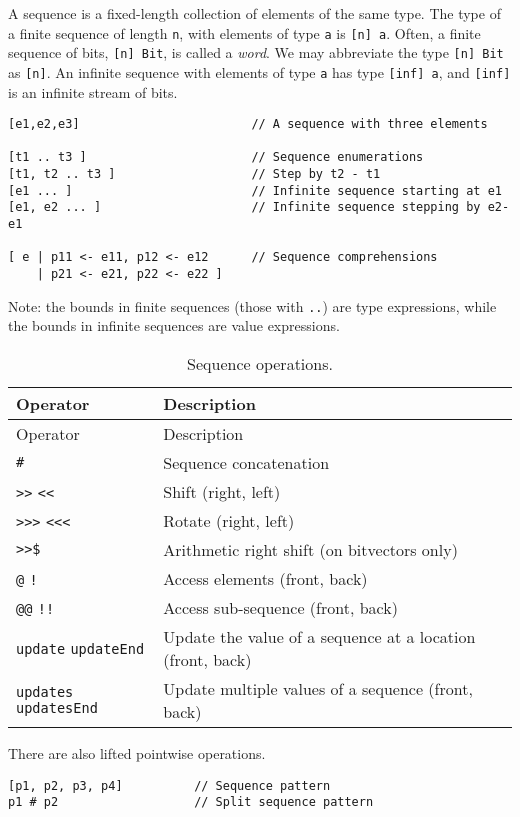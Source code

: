 A sequence is a fixed-length collection of elements of the same type.
The type of a finite sequence of length \texttt{n}, with elements of
type \texttt{a} is \texttt{{[}n{]}\ a}. Often, a finite sequence of
bits, \texttt{{[}n{]}\ Bit}, is called a \emph{word}. We may abbreviate
the type \texttt{{[}n{]}\ Bit} as \texttt{{[}n{]}}. An infinite sequence
with elements of type \texttt{a} has type \texttt{{[}inf{]}\ a}, and
\texttt{{[}inf{]}} is an infinite stream of bits.

\begin{verbatim}
[e1,e2,e3]                        // A sequence with three elements

[t1 .. t3 ]                       // Sequence enumerations
[t1, t2 .. t3 ]                   // Step by t2 - t1
[e1 ... ]                         // Infinite sequence starting at e1
[e1, e2 ... ]                     // Infinite sequence stepping by e2-e1

[ e | p11 <- e11, p12 <- e12      // Sequence comprehensions
    | p21 <- e21, p22 <- e22 ]
\end{verbatim}

Note: the bounds in finite sequences (those with \texttt{..}) are type
expressions, while the bounds in infinite sequences are value
expressions.

\begin{longtable}[]{@{}ll@{}}
\caption{Sequence operations.}\tabularnewline
\toprule
Operator & Description\tabularnewline
\midrule
\endfirsthead
\toprule
Operator & Description\tabularnewline
\midrule
\endhead
\texttt{\#} & Sequence concatenation\tabularnewline
\texttt{\textgreater{}\textgreater{}} \texttt{\textless{}\textless{}} &
Shift (right, left)\tabularnewline
\texttt{\textgreater{}\textgreater{}\textgreater{}}
\texttt{\textless{}\textless{}\textless{}} & Rotate (right,
left)\tabularnewline
\texttt{\textgreater{}\textgreater{}\$} & Arithmetic right shift (on
bitvectors only)\tabularnewline
\texttt{@} \texttt{!} & Access elements (front, back)\tabularnewline
\texttt{@@} \texttt{!!} & Access sub-sequence (front,
back)\tabularnewline
\texttt{update} \texttt{updateEnd} & Update the value of a sequence at a
location (front, back)\tabularnewline
\texttt{updates} \texttt{updatesEnd} & Update multiple values of a
sequence (front, back)\tabularnewline
\bottomrule
\end{longtable}

There are also lifted pointwise operations.

\begin{verbatim}
[p1, p2, p3, p4]          // Sequence pattern
p1 # p2                   // Split sequence pattern
\end{verbatim}

